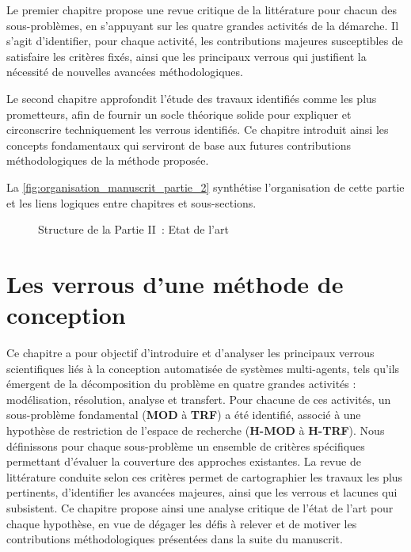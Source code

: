 Le premier chapitre propose une revue critique de la littérature pour chacun des sous-problèmes, en s’appuyant sur les quatre grandes activités de la démarche. Il s’agit d’identifier, pour chaque activité, les contributions majeures susceptibles de satisfaire les critères fixés, ainsi que les principaux verrous qui justifient la nécessité de nouvelles avancées méthodologiques.

Le second chapitre approfondit l’étude des travaux identifiés comme les plus prometteurs, afin de fournir un socle théorique solide pour expliquer et circonscrire techniquement les verrous identifiés. Ce chapitre introduit ainsi les concepts fondamentaux qui serviront de base aux futures contributions méthodologiques de la méthode proposée.

La \autoref{fig:organisation_manuscrit_partie_2} synthétise l’organisation de cette partie et les liens logiques entre chapitres et sous-sections.


\begin{figure}[h!]
    \centering
    \resizebox{0.8\textwidth}{!}{%
        
    }
    \caption{Structure de la Partie II~: Etat de l'art}
    \label{fig:organisation_manuscrit_partie_2}
\end{figure}

\clearpage
\thispagestyle{empty}
\null
\newpage


\chapter{Les verrous d'une méthode de conception}
\label{chap:verrous}

\noindent
Ce chapitre a pour objectif d’introduire et d’analyser les principaux verrous scientifiques liés à la conception automatisée de systèmes multi-agents, tels qu’ils émergent de la décomposition du problème en quatre grandes activités : modélisation, résolution, analyse et transfert. Pour chacune de ces activités, un sous-problème fondamental (\textbf{MOD} à \textbf{TRF}) a été identifié, associé à une hypothèse de restriction de l’espace de recherche (\textbf{H-MOD} à \textbf{H-TRF}). Nous définissons pour chaque sous-problème un ensemble de critères spécifiques permettant d’évaluer la couverture des approches existantes. La revue de littérature conduite selon ces critères permet de cartographier les travaux les plus pertinents, d’identifier les avancées majeures, ainsi que les verrous et lacunes qui subsistent. Ce chapitre propose ainsi une analyse critique de l’état de l’art pour chaque hypothèse, en vue de dégager les défis à relever et de motiver les contributions méthodologiques présentées dans la suite du manuscrit.

